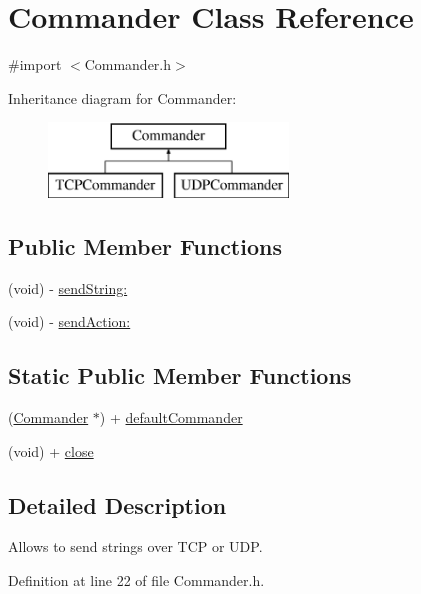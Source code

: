 \hypertarget{interface_commander}{
\section{Commander Class Reference}
\label{interface_commander}
}


{\ttfamily \#import $<$Commander.h$>$}

Inheritance diagram for Commander:\begin{figure}[H]
\begin{center}
\leavevmode
\includegraphics[height=2.000000cm]{interface_commander}
\end{center}
\end{figure}
\subsection*{Public Member Functions}
\begin{DoxyCompactItemize}
\item 
(void) -\/ \hyperlink{interface_commander_ad6aef6df3f59e357743fac86199523d3}{sendString:}
\item 
(void) -\/ \hyperlink{interface_commander_ab8504cc4f3451713d86464e09bf5062c}{sendAction:}
\end{DoxyCompactItemize}
\subsection*{Static Public Member Functions}
\begin{DoxyCompactItemize}
\item 
(\hyperlink{interface_commander}{Commander} $\ast$) + \hyperlink{interface_commander_a972c4371ba47e2604a0521f91e099ecf}{defaultCommander}
\item 
(void) + \hyperlink{interface_commander_a5ae591df94fc66ccb85cbb6565368bca}{close}
\end{DoxyCompactItemize}


\subsection{Detailed Description}
Allows to send strings over TCP or UDP. 

Definition at line 22 of file Commander.h.




